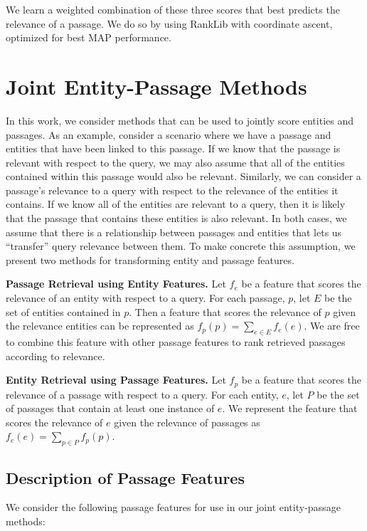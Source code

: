 \documentclass{article}
\begin{document}
We learn a weighted combination of these three scores that best predicts the relevance of a passage.  We do so by using RankLib with coordinate ascent, optimized for best MAP performance.


\section{Joint Entity-Passage Methods}\label{sec:joint}


In this work, we consider methods that can be used to jointly score entities and passages.
As an example, consider a scenario where we have a passage and entities that have been linked to this passage.
If we know that the passage is relevant with respect to the query, we may also assume that all of the entities contained within this passage would also be relevant.
Similarly, we can consider a passage's relevance to a query with respect to the relevance of the entities it contains.
If we know all of the entities are relevant to a query, then it is likely that the passage that contains these entities is also relevant.
In both cases, we assume that there is a relationship between passages and entities that lets us ``transfer'' query relevance between them.
To make concrete this assumption, we present two methods for transforming entity and passage features.

\textbf{Passage Retrieval using Entity Features.} Let $f_e$ be a feature that scores the relevance of an entity with respect to a query.
For each passage, $p$, let $E$ be the set of entities contained in $p$.
Then a feature that scores the relevance of $p$ given the relevance entities can be represented as $f_p(p) = \sum_{e \in E}{f_e(e)}$. 
We are free to combine this feature with other passage features to rank retrieved passages according to relevance.

\textbf{Entity Retrieval using Passage Features.} Let $f_p$ be a feature that scores the relevance of a passage with respect to a query.
For each entity, $e$, let $P$ be the set of passages that contain at least one instance of $e$.
We represent the feature that scores the relevance of $e$ given the relevance of passages as $f_e(e) = \sum_{p \in P}{f_p(p)}$.

\subsection{Description of Passage Features}\label{sec:jointpassage}
We consider the following passage features for use in our joint entity-passage methods:
\end{document}
